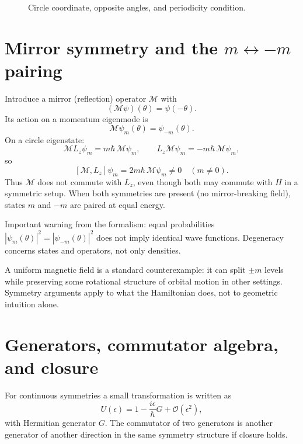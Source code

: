 \begin{figure}[h]
\centering
{}
\caption{Circle coordinate, opposite angles, and periodicity condition.}
\end{figure}

\section{Mirror symmetry and the \(m\leftrightarrow -m\) pairing}
Introduce a mirror (reflection) operator \(\mathcal M\) with
\[
(\mathcal M\psi)(\theta)=\psi(-\theta).
\]
Its action on a momentum eigenmode is
\[
\mathcal M\psi_m(\theta)=\psi_{-m}(\theta).
\]
On a circle eigenstate:
\[
\mathcal M L_z\psi_m = m\hbar\,\mathcal M\psi_m,\qquad
L_z\mathcal M\psi_m = -m\hbar\,\mathcal M\psi_m,
\]
so
\[
[\mathcal M,L_z]\psi_m = 2m\hbar\,\mathcal M\psi_m\neq 0\quad (m\neq0).
\]
Thus \(\mathcal M\) does not commute with \(L_z\), even though both may commute with \(H\) in a symmetric setup. When both symmetries are present (no mirror-breaking field), states \(m\) and \(-m\) are paired at equal energy.

Important warning from the formalism: equal probabilities \(|\psi_m(\theta)|^2=|\psi_{-m}(\theta)|^2\) does not imply identical wave functions. Degeneracy concerns states and operators, not only densities.

A uniform magnetic field is a standard counterexample: it can split \(\pm m\) levels while preserving some rotational structure of orbital motion in other settings. Symmetry arguments apply to what the Hamiltonian does, not to geometric intuition alone.

\section{Generators, commutator algebra, and closure}
For continuous symmetries a small transformation is written as
\[
U(\epsilon)=1-\frac{i\epsilon}{\hbar}G+\mathcal O(\epsilon^2),
\]
with Hermitian generator \(G\). The commutator of two generators is another generator of another direction in the same symmetry structure if closure holds.

